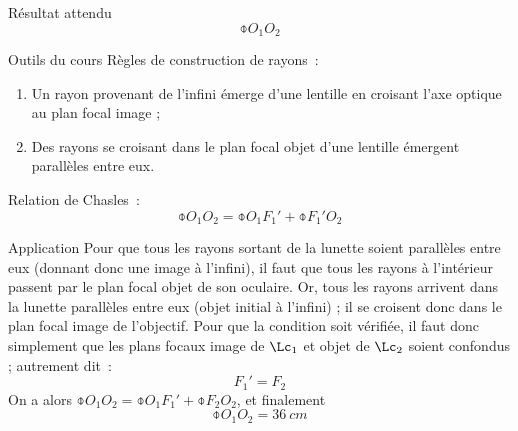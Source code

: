 \documentclass[a4paper, 12pt, final, garamond]{book}
\begin{document}
\subsubsection{}\label{sssec:k_encomb}

\begin{tcbraster}[raster columns=7, raster equal height=rows]
    \begin{tcolorbox}[blankest, raster multicolumn=3, space to=\myspac]
        \begin{tcbraster}[raster columns=1]
            \begin{NCprop}[]{Résultat attendu}
                $$\obar{O_1O_2}$$
            \end{NCprop}
            \begin{NCrapp}[add to natural height=\myspac]{Outils du cours}
                Règles de construction de rayons~:
                \begin{enumerate}
                    \item Un rayon provenant de l'infini émerge d'une lentille en croisant
                        l'axe optique au plan focal image ;
                    \item Des rayons se croisant dans le plan focal objet d'une lentille
                        émergent parallèles entre eux.
                \end{enumerate}
                Relation de Chasles~:
                \[ \obar{O_1O_2} = \obar{O_1F_1'} + \obar{F_1'O_2} \]
            \end{NCrapp}
        \end{tcbraster}
    \end{tcolorbox}
    \begin{NCexem}[raster multicolumn=4]{Application}
        Pour que tous les rayons sortant de la lunette soient parallèles entre eux
        (donnant donc une image à l'infini), il faut que tous les rayons à
        l'intérieur passent par le plan focal objet de son oculaire.\bigbreak
        Or, tous les rayons arrivent dans la lunette parallèles entre eux (objet
        initial à l'infini) ; il se croisent donc dans le plan focal image de
        l'objectif. \bigbreak
        Pour que la condition soit vérifiée, il faut donc simplement que les plans
        focaux image de $\Lc_1$ et objet de $\Lc_2$ soient confondus ; autrement dit~:
        \[ \boxed{F_1' = F_2} \]
        On a alors $\obar{O_1O_2} = \obar{O_1F_1'} + \obar{F_2O_2}$, et finalement
        \[ \boxed{\obar{O_1O_2} = \SI{+36}{cm}} \]
    \end{NCexem}
\end{tcbraster}
\end{document}
